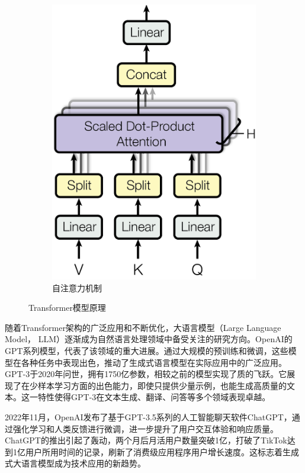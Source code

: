 \documentclass[a4paper]{report}
\begin{document}
\begin{figure}[H]
\begin{subfigure}[b]{0.4\textwidth}
		\includegraphics[width=\textwidth]{figures/ModalNet-32.png}
		\caption{自注意力机制}
		\label{自注意力机制}
	\end{subfigure}
	\caption{Transformer模型原理}
	\label{Transformer模型原理}
\end{figure}

随着Transformer架构的广泛应用和不断优化，大语言模型（Large Language Model， LLM）逐渐成为自然语言处理领域中备受关注的研究方向。OpenAI的GPT系列模型，代表了该领域的重大进展。通过大规模的预训练和微调，这些模型在各种任务中表现出色，推动了生成式语言模型在实际应用中的广泛应用。GPT-3于2020年问世，拥有1750亿参数，相较之前的模型实现了质的飞跃。它展现了在少样本学习方面的出色能力，即使只提供少量示例，也能生成高质量的文本。这一特性使得GPT-3在文本生成、翻译、问答等多个领域表现卓越。

2022年11月，OpenAI发布了基于GPT-3.5系列的人工智能聊天软件ChatGPT，通过强化学习和人类反馈进行微调，进一步提升了用户交互体验和响应质量。ChatGPT的推出引起了轰动，两个月后月活用户数量突破1亿，打破了TikTok达到1亿用户所用时间的记录，刷新了消费级应用程序用户增长速度。这标志着生成式大语言模型成为技术应用的新趋势。
\end{document}
